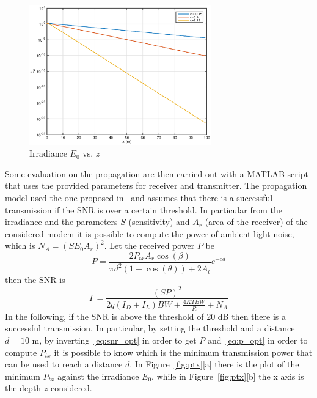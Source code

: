 \documentclass[10pt]{article}
\begin{document}
\begin{figure}[h!]
	\centering
	\includegraphics[width = 0.7\textwidth]{e0_z}
	\caption{Irradiance $E_0$ vs. $z$}
	\label{fig:e0zm}
\end{figure}

Some evaluation on the propagation are then carried out with a MATLAB script that uses the provided parameters for receiver and transmitter. The propagation model used the one proposed in~\cite{optmodel} and assumes that there is a successful transmission if the SNR is over a certain threshold. In particular from the irradiance and the parameters $S$ (sensitivity) and $A_r$ (area of the receiver) of the considered modem it is possible to compute the power of ambient light noise, which is $N_A = (S E_0 A_r)^2$. Let the received power $P$ be
\begin{equation}
	P = \frac{2 P_{tx} A_r \cos(\beta)}{\pi d^2 (1-\cos(\theta)) + 2 A_t}e^{-cd}
	\label{eq:p_opt}
\end{equation}
then the SNR is
\begin{equation}
	\Gamma  = \frac{(SP)^2}{2q(I_D + I_L)BW + \frac{4KTBW}{R} + N_A}
	\label{eq:snr_opt}
\end{equation}
In the following, if the SNR is above the threshold of 20 dB then there is a successful transmission. In particular, by setting the threshold and a distance $d = 10$ m, by inverting~\eqref{eq:snr_opt} in order to get $P$ and~\eqref{eq:p_opt} in order to compute $P_{tx}$ it is possible to know which is the minimum transmission power that can be used to reach a distance $d$. In Figure~\ref{fig:ptx}[a] there is the plot of the minimum $P_{tx}$ against the irradiance $E_0$, while in Figure~\ref{fig:ptx}[b] the x axis is the depth $z$ considered.
\end{document}
